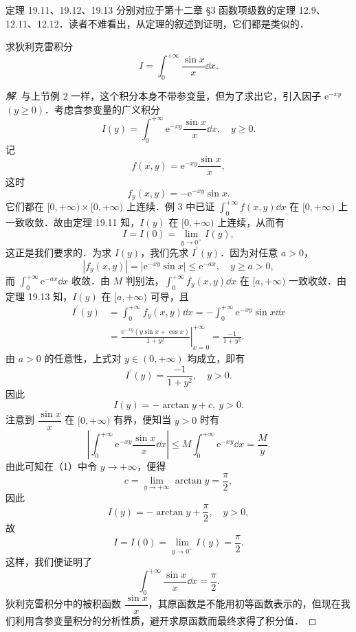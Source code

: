 定理 19.11、19.12、19.13 分别对应于第十二章 §3 函数项级数的定理 12.9、12.11、12.12．读者不难看出，从定理的叙述到证明，它们都是类似的．

\begin{example}\label{ex:19-2-4}
求狄利克雷积分
\[
I=\int_{0}^{+\infty}\frac{\sin x}{x}\dd x.
\]
\end{example}

\begin{proof}[解]
与上节例 2 一样，这个积分本身不带参变量，但为了求出它，引入因子 $\mathrm{e}^{-xy}$ $(y\geqslant 0)$．考虑含参变量的广义积分
\[
I(y)=\int_{0}^{+\infty}\mathrm{e}^{-xy}\frac{\sin x}{x}\dd x,\quad y\geqslant 0.
\]
记
\[
f(x,y)=\mathrm{e}^{-xy}\frac{\sin x}{x},
\]
这时
\[
f_{y}(x,y)=-\mathrm{e}^{-xy}\sin x.
\]
它们都在 $[0,+\infty)\times[0,+\infty)$ 上连续．例 3 中已证 $\displaystyle\int_{0}^{+\infty}f(x,y)\dd x$ 在 $[0,+\infty)$ 上一致收敛．故由定理 19.11 知，$I(y)$ 在 $[0,+\infty)$ 上连续，从而有
\[
I=I(0)=\lim_{y\to 0^{+}}I(y),
\]
这正是我们要求的．为求 $I(y)$，我们先求 $I^{\prime}(y)$．因为对任意 $a>0$，
\[
|f_{y}(x,y)|=|\mathrm{e}^{-xy}\sin x|\leqslant\mathrm{e}^{-ax},\quad y\geqslant a>0,
\]
而 $\displaystyle\int_{0}^{+\infty}\mathrm{e}^{-ax}\dd x$ 收敛．由 $M$ 判别法，$\displaystyle\int_{0}^{+\infty}f_{y}(x,y)\dd x$ 在 $[a,+\infty)$ 一致收敛．由定理 19.13 知，$I(y)$ 在 $[a,+\infty)$ 可导，且
\[
\begin{aligned}
I^{\prime}(y)&=\int_{0}^{+\infty}f_{y}(x,y)\dd x=-\int_{0}^{+\infty}\mathrm{e}^{-xy}\sin x\dd x\\
&=\left.\frac{\mathrm{e}^{-xy}\left(y\sin x+\cos x\right)}{1+y^{2}}\right|_{x=0}^{+\infty}=\frac{-1}{1+y^{2}}.
\end{aligned}
\]
由 $a>0$ 的任意性，上式对 $y\in(0,+\infty)$ 均成立，即有
\[
I^{\prime}(y)=\frac{-1}{1+y^{2}},\quad y>0.
\]
因此
\begin{equation}
I(y)=-\arctan y+c,\ y>0.
\tag{1}
\end{equation}
注意到 $\dfrac{\sin x}{x}$ 在 $[0,+\infty)$ 有界，便知当 $y>0$ 时有
\[
\left|\int_{0}^{+\infty}\mathrm{e}^{-xy}\frac{\sin x}{x}\dd x\right|\leqslant M\int_{0}^{+\infty}\mathrm{e}^{-xy}\dd x=\frac{M}{y}.
\]
由此可知在（1）中令 $y\to+\infty$，便得
\[
c=\lim_{y\to+\infty}\arctan y=\frac{\pi}{2},
\]
因此
\[
I(y)=-\arctan y+\frac{\pi}{2},\quad y>0,
\]
故
\[
I=I(0)=\lim_{y\to 0^{+}}I(y)=\frac{\pi}{2}.
\]
这样，我们便证明了
\[
\int_{0}^{+\infty}\frac{\sin x}{x}\dd x=\frac{\pi}{2}.
\]
狄利克雷积分中的被积函数 $\dfrac{\sin x}{x}$，其原函数是不能用初等函数表示的，但现在我们利用含参变量积分的分析性质，避开求原函数而最终求得了积分值．


\end{proof}

